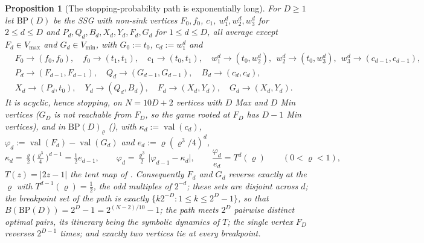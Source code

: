 \documentclass[11pt]{article}
\theoremstyle{plain}
\newtheorem{proposition}[theorem]{Proposition}
\theoremstyle{definition}
\DeclareMathOperator{\val}{val}
\newcommand{\Vmax}{V_{\max}}
\newcommand{\Vmin}{V_{\min}}
\begin{document}
\begin{proposition}[The stopping-probability path is exponentially long]\label{prop:discount-fold}
For $D\ge1$ let $\mathrm{BP}(D)$ be the SSG with non-sink vertices
$F_0,f_0$, $c_1$, $w^{d}_1,w^{d}_2,w^{d}_3$ for $2\le d\le D$ and
$P_d,Q_d,B_d,X_d,Y_d,F_d,G_d$ for $1\le d\le D$, all average except
$F_d\in\Vmax$ and $G_d\in\Vmin$, with $G_0:=t_0$, $c_d:=w^{d}_1$ and
\[
 \begin{aligned}
  &F_0\to(f_0,f_0),\quad f_0\to(t_1,t_1),\quad c_1\to(t_0,t_1),\quad
   w^{d}_1\to(t_0,w^{d}_2),\ \ w^{d}_2\to(t_0,w^{d}_3),\ \ w^{d}_3\to(c_{d-1},c_{d-1}),\\
  &P_d\to(F_{d-1},F_{d-1}),\quad Q_d\to(G_{d-1},G_{d-1}),\quad B_d\to(c_d,c_d),\\
  &X_d\to(P_d,t_0),\quad Y_d\to(Q_d,B_d),\quad F_d\to(X_d,Y_d),\quad G_d\to(X_d,Y_d).
 \end{aligned}
\]
It is acyclic, hence stopping, on $N=10D+2$ vertices with $D$ Max and $D$
Min vertices ($G_D$ is not reachable from $F_D$, so the game rooted at
$F_D$ has $D-1$ Min vertices), and in $\mathrm{BP}(D)_{\varrho}$
(),
with $\kappa_d:=\val(c_d)$, $\varphi_d:=\val(F_d)-\val(G_d)$ and
$e_d:=\varrho(\varrho^{3}/4)^{d}$,
\[
  \kappa_d=\tfrac{\varrho}2\bigl(\tfrac{\varrho^{3}}4\bigr)^{d-1}=\tfrac12e_{d-1},\qquad
  \varphi_d=\tfrac{\varrho^{3}}2\,\bigl|\varphi_{d-1}-\kappa_d\bigr|,\qquad
  \frac{\varphi_d}{e_d}=T^{d}(\varrho)\qquad(0<\varrho<1),
\]
$T(z)=|2z-1|$ the tent map of . Consequently $F_d$ and $G_d$
reverse exactly at the $\varrho$ with $T^{d-1}(\varrho)=\tfrac12$, the odd
multiples of $2^{-d}$; these sets are disjoint across $d$; the breakpoint
set of the path is exactly $\{k2^{-D}:1\le k\le2^{D}-1\}$, so that
$B(\mathrm{BP}(D))=2^{D}-1=2^{(N-2)/10}-1$; the path meets $2^{D}$ pairwise
distinct optimal pairs, its itinerary being the symbolic dynamics of $T$;
the single vertex $F_D$ reverses $2^{D-1}$ times; and exactly two vertices
tie at every breakpoint.
\end{proposition}
\end{document}
